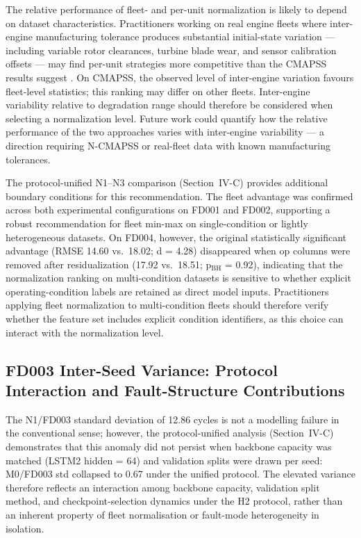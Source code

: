 \documentclass[review,12pt]{elsarticle}
\begin{document}
The relative performance of fleet- and per-unit normalization is likely to depend on dataset characteristics. Practitioners working on real engine fleets where inter-engine manufacturing tolerance produces substantial initial-state variation — including variable rotor clearances, turbine blade wear, and sensor calibration offsets — may find per-unit strategies more competitive than the CMAPSS results suggest \cite{ref29}. On CMAPSS, the observed level of inter-engine variation favours fleet-level statistics; this ranking may differ on other fleets. Inter-engine variability relative to degradation range should therefore be considered when selecting a normalization level. Future work could quantify how the relative performance of the two approaches varies with inter-engine variability --- a direction requiring N-CMAPSS or real-fleet data with known manufacturing tolerances.

The protocol-unified N1--N3 comparison (Section~IV-C) provides additional boundary conditions for this recommendation. The fleet advantage was confirmed across both experimental configurations on FD001 and FD002, supporting a robust recommendation for fleet min-max on single-condition or lightly heterogeneous datasets. On FD004, however, the original statistically significant advantage (RMSE 14.60 vs.\ 18.02; d = 4.28) disappeared when op columns were removed after residualization (17.92 vs.\ 18.51; p$_\text{BH}$ = 0.92), indicating that the normalization ranking on multi-condition datasets is sensitive to whether explicit operating-condition labels are retained as direct model inputs. Practitioners applying fleet normalization to multi-condition fleets should therefore verify whether the feature set includes explicit condition identifiers, as this choice can interact with the normalization level.

\subsection{FD003 Inter-Seed Variance: Protocol Interaction and Fault-Structure Contributions}

The N1/FD003 standard deviation of 12.86 cycles is not a modelling failure in the conventional sense; however, the protocol-unified analysis (Section~IV-C) demonstrates that this anomaly did not persist when backbone capacity was matched (LSTM2 hidden = 64) and validation splits were drawn per seed: M0/FD003 std collapsed to 0.67 under the unified protocol. The elevated variance therefore reflects an interaction among backbone capacity, validation split method, and checkpoint-selection dynamics under the H2 protocol, rather than an inherent property of fleet normalisation or fault-mode heterogeneity in isolation.
\end{document}

